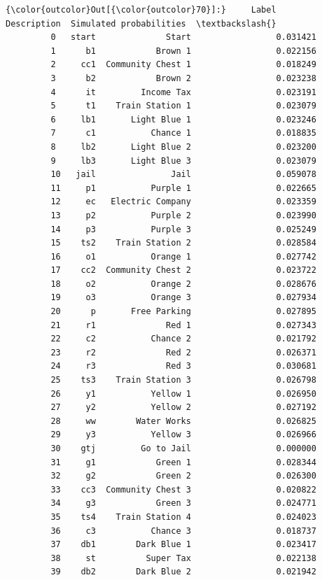 \documentclass[11pt]{article}
\begin{document}
\begin{Verbatim}[commandchars=\\\{\}]
{\color{outcolor}Out[{\color{outcolor}70}]:}     Label        Description  Simulated probabilities  \textbackslash{}
         0   start              Start                 0.031421   
         1      b1            Brown 1                 0.022156   
         2     cc1  Community Chest 1                 0.018249   
         3      b2            Brown 2                 0.023238   
         4      it         Income Tax                 0.023191   
         5      t1    Train Station 1                 0.023079   
         6     lb1       Light Blue 1                 0.023246   
         7      c1           Chance 1                 0.018835   
         8     lb2       Light Blue 2                 0.023200   
         9     lb3       Light Blue 3                 0.023079   
         10   jail               Jail                 0.059078   
         11     p1           Purple 1                 0.022665   
         12     ec   Electric Company                 0.023359   
         13     p2           Purple 2                 0.023990   
         14     p3           Purple 3                 0.025249   
         15    ts2    Train Station 2                 0.028584   
         16     o1           Orange 1                 0.027742   
         17    cc2  Community Chest 2                 0.023722   
         18     o2           Orange 2                 0.028676   
         19     o3           Orange 3                 0.027934   
         20      p       Free Parking                 0.027895   
         21     r1              Red 1                 0.027343   
         22     c2           Chance 2                 0.021792   
         23     r2              Red 2                 0.026371   
         24     r3              Red 3                 0.030681   
         25    ts3    Train Station 3                 0.026798   
         26     y1           Yellow 1                 0.026950   
         27     y2           Yellow 2                 0.027192   
         28     ww        Water Works                 0.026825   
         29     y3           Yellow 3                 0.026966   
         30    gtj         Go to Jail                 0.000000   
         31     g1            Green 1                 0.028344   
         32     g2            Green 2                 0.026300   
         33    cc3  Community Chest 3                 0.020822   
         34     g3            Green 3                 0.024771   
         35    ts4    Train Station 4                 0.024023   
         36     c3           Chance 3                 0.018737   
         37    db1        Dark Blue 1                 0.023417   
         38     st          Super Tax                 0.022138   
         39    db2        Dark Blue 2                 0.021942   
         

\end{Verbatim}
\end{document}
